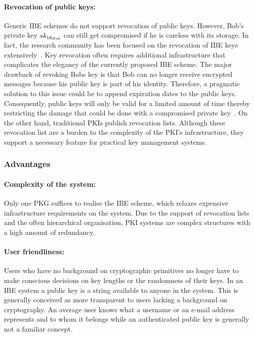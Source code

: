 \paragraph{Revocation of public keys:}
Generic IBE schemes do not support revocation of public keys. However, Bob's private key $sk_{\mathtt{id}_{Bob}}$ can still get compromised if he is careless with its storage. In fact, the research community has been focused on the revocation of IBE keys extensively~\cite{art:BoldyrevaGK12,art:BonehDTW01,art:HanaokaHSI05,art:LibertQ03}. Key revocation often requires additional infrastructure that complicates the elegancy of the currently proposed IBE scheme. The major drawback of revoking Bobs key is that Bob can no longer receive encrypted messages because his public key is part of his identity. Therefore, a pragmatic solution to this issue could be to append expiration dates to the public keys. Consequently, public keys will only be valid for a limited amount of time thereby restricting the damage that could be done with a compromised private key~\cite{art:BonehF01}. On the other hand, traditional PKIs publish revocation lists. Although these revocation list are a burden to the complexity of the PKI's infrastructure, they support a necessary feature for practical key management systems. 

\subsubsection{Advantages}
\paragraph{Complexity of the system:}
Only one PKG suffices to realise the IBE scheme, which relaxes expensive infrastructure requirements on the system. Due to the support of revocation lists and the often hierarchical organisation, PKI systems are complex structures with a high amount of redundancy.

\paragraph{User friendliness:}
Users who have no background on cryptographic primitives no longer have to make conscious decisions on key lengths or the randomness of their keys. In an IBE system a public key is a string available to anyone in the system. This is generally conceived as more transparent to users lacking a background on cryptography. An average user knows what a username or an e-mail address represents and to whom it belongs while an authenticated public key is generally not a familiar concept.

